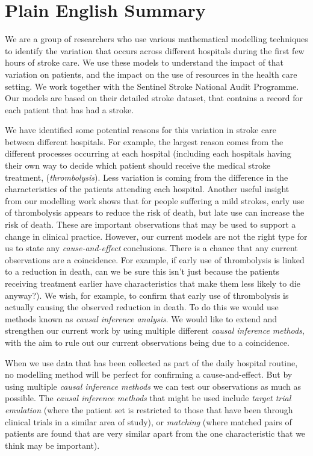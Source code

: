 \section*{Plain English Summary}

We are a group of researchers who use various mathematical modelling techniques to identify the variation that occurs across different hospitals during the first few hours of stroke care. We use these models to understand the impact of that variation on patients, and the impact on the use of resources in the health care setting. We work together with the Sentinel Stroke National Audit Programme. Our models are based on their detailed stroke dataset, that contains a record for each patient that has had a stroke.

We have identified some potential reasons for this variation in stroke care between different hospitals. For example, the largest reason comes from the different processes occurring at each hospital (including each hospitals having their own way to decide which patient should receive the medical stroke treatment, (\textit{thrombolysis}). Less variation is coming from the difference in the characteristics of the patients attending each hospital. Another useful insight from our modelling work shows that for people suffering a mild strokes, early use of thrombolysis appears to reduce the risk of death, but late use can increase the risk of death. These are important observations that may be used to support a change in clinical practice. However, our current models are not the right type for us to state any \textit{cause-and-effect} conclusions. There is a chance that any current observations are a coincidence. For example, if early use of thrombolysis is linked to a reduction in death, can we be sure this isn't just because the patients receiving treatment earlier have characteristics that make them less likely to die anyway?). We wish, for example, to confirm that early use of thrombolysis is actually causing the observed reduction in death. To do this we would use methods known as \textit{causal inference analysis}. We would like to extend and strengthen our current work by using multiple different \textit{causal inference methods}, with the aim to rule out our current observations being due to a coincidence.

When we use data that has been collected as part of the daily hospital routine, no modelling method will be perfect for confirming a cause-and-effect. But by using multiple \textit{causal inference methods} we can test our observations as much as possible. The \textit{causal inference methods} that might be used include \textit{target trial emulation} (where the patient set is restricted to those that have been through clinical trials in a similar area of study), or \textit{matching} (where matched pairs of patients are found that are very similar apart from the one characteristic that we think may be important).

